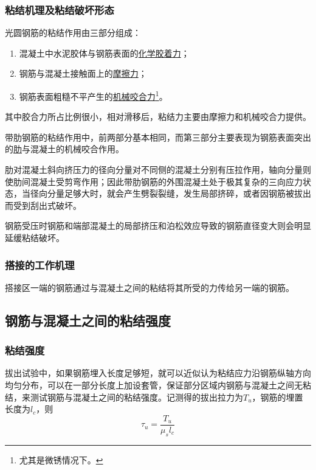 \documentclass{article}
\begin{document}
\subsubsection{粘结机理及粘结破坏形态}
\par 光圆钢筋的粘结作用由三部分组成：
\begin{enumerate}
      \item 混凝土中水泥胶体与钢筋表面的\underline{化学胶着力}；
      \item 钢筋与混凝土接触面上的\underline{摩擦力}；
      \item 钢筋表面粗糙不平产生的\underline{机械咬合力}\footnote{尤其是微锈情况下。}。
\end{enumerate}
\par 其中胶合力所占比例很小，相对滑移后，粘结力主要由摩擦力和机械咬合力提供。
\par 带肋钢筋的粘结作用中，前两部分基本相同，而第三部分主要表现为钢筋表面突出的\underline{肋}与混凝土的机械咬合作用。
\par 肋对混凝土斜向挤压力的径向分量对不同侧的混凝土分别有压拉作用，轴向分量则使肋间混凝土受剪弯作用；因此带肋钢筋的外围混凝土处于极其复杂的三向应力状态，当径向分量足够大时，就会产生劈裂裂缝，发生局部挤碎，或者因钢筋被拔出而受到刮出式破坏。
\par 钢筋受压时钢筋和端部混凝土的局部挤压和泊松效应导致的钢筋直径变大则会明显延缓粘结破坏。
\subsubsection{搭接的工作机理}
\par 搭接区一端的钢筋通过与混凝土之间的粘结将其所受的力传给另一端的钢筋。
\subsection{钢筋与混凝土之间的粘结强度}
\subsubsection{粘结强度}
\par 拔出试验中，如果钢筋埋入长度足够短，就可以近似认为粘结应力沿钢筋纵轴方向均匀分布，可以在一部分长度上加设套管，保证部分区域内钢筋与混凝土之间无粘结，来测试钢筋与混凝土之间的粘结强度。记测得的拔出拉力为$T_u$，钢筋的埋置长度为$l_c$，则
$$\tau_u=\frac{T_u}{\mu_sl_c}$$
\end{document}
